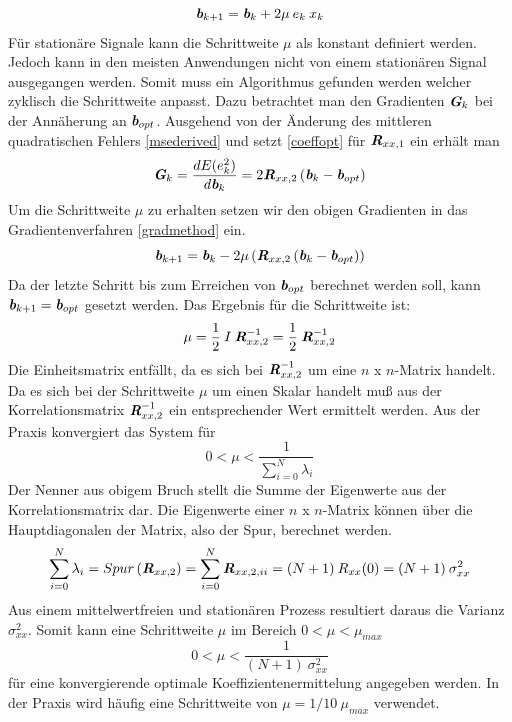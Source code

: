 \documentclass[
    10pt, %
    DIV12,
    english, %
    a5paper, %
    twoside, %
    titlepage, %
    parskip=half, %
    headings=small, %
    listof=totoc, %
    bibliography=totoc, %
    index=totoc, %
    captions=tableheading, %
    final %
]{scrbook}
\begin{document}
\begin{equation}\label{gradmethod2}
\textit{\textbf{b}}_{k+1}=\textit{\textbf{b}}_k+2\mu\:e_k\:x_k
\end{equation}
Für stationäre Signale kann die Schrittweite $\mu$ als konstant definiert werden. Jedoch kann in den meisten Anwendungen nicht von einem stationären Signal ausgegangen werden.
Somit muss ein Algorithmus gefunden werden welcher zyklisch die Schrittweite anpasst. Dazu betrachtet man den Gradienten $\textit{\textbf{G}}_k$ bei der Annäherung an $\textit{\textbf{b}}_{opt}$. Ausgehend von der Änderung des mittleren quadratischen Fehlers \eqref{msederived} und setzt \eqref{coeffopt} für $\textit{\textbf{R}}_{xx,1}$ ein erhält man 
\begin{equation}
\textit{\textbf{G}}_k=\frac{dE(e_k^2)}{d\textit{\textbf{b}}_k}=2\textit{\textbf{R}}_{xx,2}\left(\textit{\textbf{b}}_k-\textit{\textbf{b}}_{opt}\right)\nonumber
\end{equation}
Um die Schrittweite $\mu$ zu erhalten setzen wir den obigen Gradienten in das Gradientenverfahren \eqref{gradmethod} ein.
\begin{equation}
\textit{\textbf{b}}_{k+1}=\textit{\textbf{b}}_k-2\mu\left(\textit{\textbf{R}}_{xx,2}\left(\textit{\textbf{b}}_k-\textit{\textbf{b}}_{opt}\right)\right)\nonumber
\end{equation}
Da der letzte Schritt bis zum Erreichen von $\textit{\textbf{b}}_{opt}$ berechnet werden soll, kann $\textit{\textbf{b}}_{k+1}=\textit{\textbf{b}}_{opt}$ gesetzt werden.
Das Ergebnis für die Schrittweite ist:
\begin{equation}
\mu=\frac{1}{2}\:I\:\textit{\textbf{R}}_{xx,2}^{-1}=\frac{1}{2}\:\textit{\textbf{R}}_{xx,2}^{-1}\nonumber
\end{equation}
Die Einheitsmatrix entfällt, da es sich bei $\textit{\textbf{R}}_{xx,2}^{-1}$ um eine $n$ x $n$-Matrix handelt. Da es sich bei der Schrittweite $\mu$ um einen Skalar handelt muß 
aus der Korrelationsmatrix $\textit{\textbf{R}}_{xx,2}^{-1}$ ein entsprechender Wert ermittelt werden. Aus der Praxis konvergiert das System für 
\begin{equation}
0 < \mu < \frac{1}{\sum\limits_{i=0}^{N}\lambda_i}\nonumber
\end{equation}
Der Nenner aus obigem Bruch stellt die Summe der Eigenwerte aus der Korrelationsmatrix dar. Die Eigenwerte einer $n$ x $n$-Matrix können über die Hauptdiagonalen der Matrix, 
also der Spur, berechnet werden. 
\begin{equation}
\sum_{i=0}^{N}\lambda_i=Spur\left(\textit{\textbf{R}}_{xx,2}\right)=\sum_{i=0}^{N}\textit{\textbf{R}}_{xx,2,ii}=(N+1)\:R_{xx}(0)=(N+1)\:\sigma_{xx}^2\nonumber
\end{equation}
Aus einem mittelwertfreien und stationären Prozess resultiert daraus die Varianz $\sigma_{xx}^2$. Somit kann eine Schrittweite $\mu$ im Bereich $0<\mu<\mu_{max}$
\begin{equation}\label{maxmu}
0 < \mu < \frac{1}{(N+1)\:\sigma_{xx}^2}
\end{equation}
für eine konvergierende optimale Koeffizientenermittelung angegeben werden. In der Praxis wird häufig eine Schrittweite von $\mu=1/10\:\mu_{max}$ verwendet.
\end{document}
